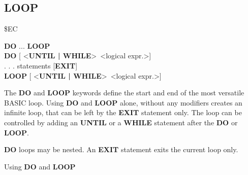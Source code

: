 \subsection{LOOP}
\begin{description}[leftmargin=3cm,style=nextline]
\item [Token:] \$EC
\item [Format:] {\bf DO} ... {\bf LOOP} \\
                {\bf DO} [ <{\bf UNTIL | WHILE}> <logical expr.>] \\
                . . . statements [{\bf EXIT}] \\
                {\bf LOOP} [ <{\bf UNTIL | WHILE}> <logical expr.>]
\item [Usage:] The {\bf DO} and {\bf LOOP} keywords define
               the start and end of the most versatile BASIC loop.
               Using {\bf DO} and {\bf LOOP} alone, without any
               modifiers creates an infinite loop, that can be left
               by the {\bf EXIT} statement only. The loop can be
               controlled by adding an {\bf UNTIL} or a {\bf WHILE}
               statement after the {\bf DO} or {\bf LOOP}.

\item [Remarks:] {\bf DO} loops may be nested. An {\bf EXIT} statement
               exits the current loop only.
\item [Example:] Using {\bf DO} and {\bf LOOP}
\end{description}


\newpage
